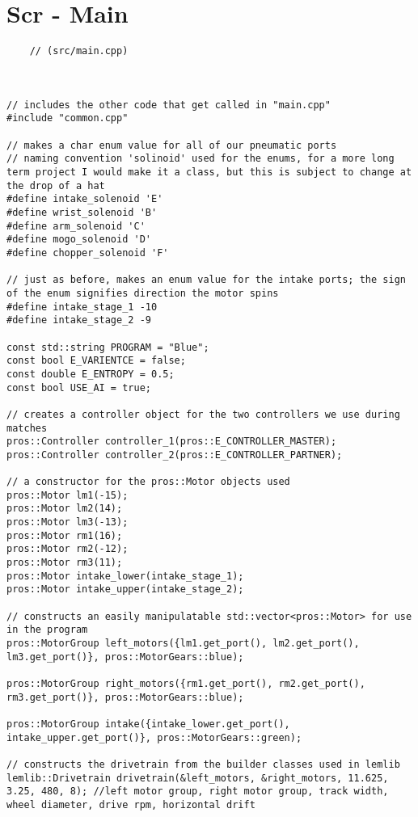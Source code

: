 \section*{Scr - Main}
\begin{verbatim}
    // (src/main.cpp)



// includes the other code that get called in "main.cpp"
#include "common.cpp"

// makes a char enum value for all of our pneumatic ports
// naming convention 'solinoid' used for the enums, for a more long term project I would make it a class, but this is subject to change at the drop of a hat
#define intake_solenoid 'E'
#define wrist_solenoid 'B'
#define arm_solenoid 'C'
#define mogo_solenoid 'D'
#define chopper_solenoid 'F'

// just as before, makes an enum value for the intake ports; the sign of the enum signifies direction the motor spins
#define intake_stage_1 -10
#define intake_stage_2 -9

const std::string PROGRAM = "Blue";
const bool E_VARIENTCE = false;
const double E_ENTROPY = 0.5;
const bool USE_AI = true;

// creates a controller object for the two controllers we use during matches
pros::Controller controller_1(pros::E_CONTROLLER_MASTER);
pros::Controller controller_2(pros::E_CONTROLLER_PARTNER);

// a constructor for the pros::Motor objects used
pros::Motor lm1(-15);
pros::Motor lm2(14);
pros::Motor lm3(-13);
pros::Motor rm1(16);
pros::Motor rm2(-12);
pros::Motor rm3(11);
pros::Motor intake_lower(intake_stage_1);
pros::Motor intake_upper(intake_stage_2);

// constructs an easily manipulatable std::vector<pros::Motor> for use in the program
pros::MotorGroup left_motors({lm1.get_port(), lm2.get_port(), lm3.get_port()}, pros::MotorGears::blue);

pros::MotorGroup right_motors({rm1.get_port(), rm2.get_port(), rm3.get_port()}, pros::MotorGears::blue);

pros::MotorGroup intake({intake_lower.get_port(), intake_upper.get_port()}, pros::MotorGears::green);

// constructs the drivetrain from the builder classes used in lemlib
lemlib::Drivetrain drivetrain(&left_motors, &right_motors, 11.625, 3.25, 480, 8); //left motor group, right motor group, track width, wheel diameter, drive rpm, horizontal drift


\end{verbatim}
